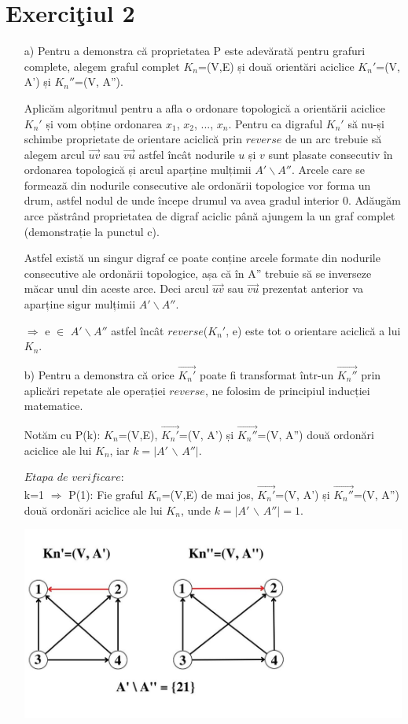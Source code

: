 \documentclass[12pt]{article}
\begin{document}
\section{Exerci\c{t}iul 2}
\begin{itemize}
    \item[a)] 
Pentru a demonstra că proprietatea P este adevărată pentru grafuri 
complete, alegem graful complet $K_n$=(V,E) și două orientări aciclice 
$K_n'$=(V, A') și $K_n''$=(V, A'').

Aplicăm algoritmul pentru a afla o ordonare topologică a orientării aciclice $K_n'$ și vom obține ordonarea $x_1$, $x_2$, ..., $x_n$. Pentru ca digraful $K_n'$ să nu-și schimbe proprietate de orientare aciclică prin $reverse$ de un arc trebuie să alegem arcul $\vec{uv}$ sau $\vec{vu}$ astfel încât nodurile $u$ și $v$ sunt plasate consecutiv în ordonarea topologică și arcul aparține mulțimii $A'\backslash A''$.
Arcele care se formează din nodurile consecutive ale ordonării topologice vor forma un drum, astfel nodul de unde începe drumul va avea gradul interior 0. Adăugăm arce păstrând proprietatea de digraf aciclic până ajungem la un graf complet (demonstrație la punctul c).

Astfel există un singur digraf ce poate conține arcele formate din nodurile consecutive ale ordonării topologice, așa că în A'' trebuie să se inverseze măcar unul din aceste arce. Deci arcul $\vec{uv}$ sau $\vec{vu}$ prezentat anterior va aparține sigur mulțimii $A'\backslash A''$.


$\Longrightarrow$ e $\in$  $A'\backslash A''$ astfel încât $reverse$($K_n'$, e) este tot o orientare aciclică a lui $K_n$.

    
    \item[b)] 
    Pentru a demonstra că orice $\vec{K_n'}$ poate fi transformat într-un $\vec{K_n''}$ prin aplicări repetate ale operației $reverse$, ne folosim de principiul inducției matematice.

	Notăm cu P(k): $K_n$=(V,E), $\vec{K_n'}$=(V, A') și $\vec{K_n''}$=(V, A'') două ordonări aciclice ale lui $K_n$, iar $k = | A'$ $\backslash$ $A'' |$.
	
	$Etapa$ $de$ $verificare$: \\
	k=1 $\Longrightarrow$ P(1): Fie graful $K_n$=(V,E) de mai jos, $\vec{K_n'}$=(V, A') și $\vec{K_n''}$=(V, A'') două ordonări aciclice ale lui $K_n$, unde  $k = | A'$ $\backslash$ $A'' | = 1$.

    \includegraphics[scale=0.5]{Tema_2_b.jpg}


\end{itemize}
\end{document}
